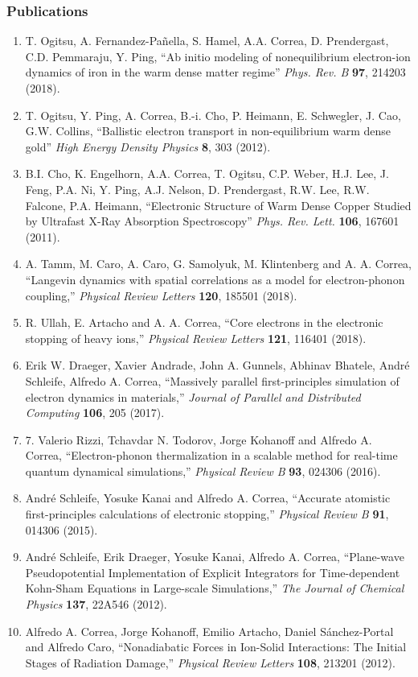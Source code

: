 \subsubsection*{Publications}
\begin{enumerate}
    \item T. Ogitsu, A. Fernandez-Pañella, S. Hamel, A.A. Correa, D. Prendergast, C.D. Pemmaraju, Y. Ping, “Ab initio modeling of nonequilibrium electron-ion dynamics of iron in the warm dense matter regime” {\it Phys. Rev. B} {\bf 97}, 214203 (2018).
    \item T. Ogitsu, Y. Ping, A. Correa, B.-i. Cho, P. Heimann, E. Schwegler, J. Cao, G.W. Collins, “Ballistic electron transport in non-equilibrium warm dense gold” {\it High Energy Density Physics} {\bf 8}, 303 (2012).
    \item B.I. Cho, K. Engelhorn, A.A. Correa, T. Ogitsu, C.P. Weber, H.J. Lee, J. Feng, P.A. Ni, Y. Ping, A.J. Nelson, D. Prendergast, R.W. Lee, R.W. Falcone, P.A. Heimann, “Electronic Structure of Warm Dense Copper Studied by Ultrafast X-Ray Absorption Spectroscopy” {\it Phys. Rev. Lett.} {\bf 106}, 167601 (2011).
    \item A. Tamm, M. Caro, A. Caro, G. Samolyuk, M. Klintenberg and A. A. Correa, “Langevin dynamics with spatial correlations as a model for electron-phonon coupling,” {\it Physical Review Letters} {\bf 120}, 185501 (2018).
    \item R. Ullah, E. Artacho and A. A. Correa, “Core electrons in the electronic stopping of heavy ions,” {\it Physical Review Letters} {\bf 121}, 116401 (2018).
    \item Erik W. Draeger, Xavier Andrade, John A. Gunnels, Abhinav Bhatele, André Schleife, Alfredo A. Correa, “Massively parallel first-principles simulation of electron dynamics in materials,” {\it Journal of Parallel and Distributed Computing} {\bf 106}, 205 (2017).
    \item 7.	Valerio Rizzi, Tchavdar N. Todorov, Jorge Kohanoff and Alfredo A. Correa, “Electron-phonon thermalization in a scalable method for real-time quantum dynamical simulations,” {\it Physical Review B} {\bf 93}, 024306 (2016).
    \item André Schleife, Yosuke Kanai and Alfredo A. Correa, “Accurate atomistic first-principles calculations of electronic stopping,” {\it Physical Review B} {\bf 91}, 014306 (2015).
    \item André Schleife, Erik Draeger, Yosuke Kanai, Alfredo A. Correa, “Plane-wave Pseudopotential Implementation of Explicit Integrators for Time-dependent Kohn-Sham Equations in Large-scale Simulations,” {\it The Journal of Chemical Physics} {\bf 137}, 22A546 (2012).
    \item Alfredo A. Correa, Jorge Kohanoff, Emilio Artacho, Daniel Sánchez-Portal and Alfredo Caro, “Nonadiabatic Forces in Ion-Solid Interactions: The Initial Stages of Radiation Damage,” {\it Physical Review Letters} {\bf 108}, 213201 (2012).

\end{enumerate}

